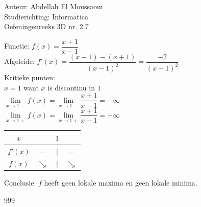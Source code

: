 \documentclass[a4paper]{article}
\begin{document}
  
\noindent \large Auteur: Abdellah El Moussaoui \\
\noindent \large Studierichting: Informatica\\
\noindent \large Oefeningenreeks 3D nr. 2.7\\

\medskip

\normalsize


Functie: $f(x) = \dfrac{x + 1}{x - 1}$ \\

Afgeleide: $f'(x) = \dfrac{\left(x-1\right) - \left(x+1\right)}{\left( x - 1\right)^2} = \dfrac{-2}{\left( x - 1\right)^2} $\\

Kritieke punten: \\

$x= 1$ want $x$ is discontinu in $1$ \\

$\lim\limits_{x \rightarrow 1-} f(x) = \lim\limits_{x \rightarrow 1-} \dfrac{x + 1}{x - 1} = -\infty$\\

$\lim\limits_{x \rightarrow 1+} f(x) = \lim\limits_{x \rightarrow 1+} \dfrac{x + 1}{x - 1} = +\infty$\\


\begin{tabular}{c|ccc}
        $x$     &  &  $1$  & \\ \hline
        $f'(x)$ & $-$       &  $|$  & $-$ \\ 
        $f(x)$  & $\searrow$  & $|$   & $\searrow$ \\
\end{tabular}

\bigskip

Conclusie: $f$ heeft geen lokale maxima en geen lokale minima.\\

\begin{thebibliography}{999}
\end{thebibliography}
\end{document}
